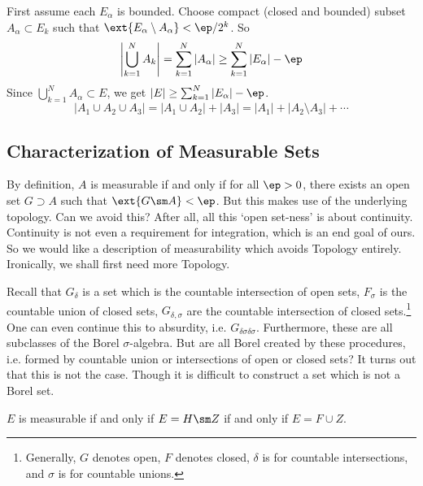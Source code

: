 First assume each $E_\alpha$ is bounded. Choose compact (closed and bounded) subset $A_\alpha \subset E_k$ such that $\ext{E_\alpha \setminus A_\alpha} < \ep/2^k$. So 
	\[
	\left| \bigcup_{k=1}^N A_k \right| = \sum_{k=1}^N |A_\alpha| \geq \sum_{k=1}^N |E_\alpha| - \ep 
	\]
Since $\bigcup_{k=1}^N A_\alpha \subset E$, we get $|E| \geq \sum_{k=1}^N |E_\alpha| - \ep$.
	\[
	|A_1 \cup A_2 \cup A_3| = |A_1 \cup A_2| + |A_3| = |A_1| + |A_2 \setminus A_3| + \cdots 
	\]

















 \subsection{Characterization of Measurable Sets}
 
 By definition, $A$ is measurable if and only if for all $\ep>0$, there exists an open set $G \supset A$ such that $\ext{G \sm A}<\ep$. But this makes use of the underlying topology. Can we avoid this? After all, all this `open set-ness' is about continuity. Continuity is not even a requirement for integration, which is an end goal of ours. So we would like a description of measurability which avoids Topology entirely. Ironically, we shall first need more Topology.
 
 Recall that $G_\delta$ is a set which is the countable intersection of open sets, $F_\sigma$ is the countable union of closed sets, $G_{\delta,\sigma}$ are the countable intersection of closed sets.\footnote{Generally, $G$ denotes open, $F$ denotes closed, $\delta$ is for countable intersections, and $\sigma$ is for countable unions.} One can even continue this to absurdity, i.e. $G_{\delta\sigma\delta\sigma}$. Furthermore, these are all subclasses of the Borel $\sigma$-algebra. But are all Borel created by these procedures, i.e. formed by countable union or intersections of open or closed sets? It turns out that this is not the case. Though it is difficult to construct a set which is not a Borel set. 
 
 \begin{thm} \label{thm:borelplusmeasure}
 $E$ is measurable if and only if $E= H \sm Z$ if and only if $E= F \cup Z$. 
 \end{thm}

